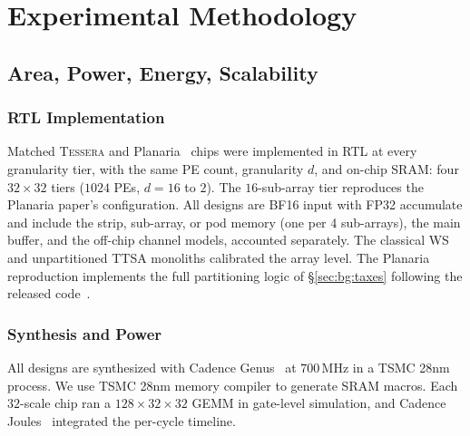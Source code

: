 \section{Experimental Methodology}
\label{sec:method}

\subsection{Area, Power, Energy, Scalability}
\label{sec:method:ppa}
\subsubsection{RTL Implementation}
Matched \textsc{Tessera} and Planaria~\cite{ghodrati2020planaria} chips were implemented
in RTL at every granularity tier, with the same PE count, granularity
$d$, and on-chip SRAM: four $32{\times}32$ tiers ($1024$ PEs,
$d{=}16$ to $2$). The $16$-sub-array tier reproduces the Planaria
paper's configuration. All designs are
BF16 input with FP32 accumulate and include the strip, sub-array, or
pod memory (one per 4 sub-arrays), the main buffer, and the off-chip
channel models, accounted separately. The classical WS and
unpartitioned TTSA
monoliths calibrated the array level. The Planaria reproduction
implements the full partitioning logic of \S\ref{sec:bg:taxes}
following the released code~\cite{ghodrati2020planaria}.

\subsubsection{Synthesis and Power}
All designs are synthesized with Cadence Genus~\cite{cadence_genus} at
$700$\,MHz in a TSMC 28nm process. We use TSMC 28nm memory compiler to generate SRAM macros.
Each $32$-scale chip ran a
$128{\times}32{\times}32$ GEMM in gate-level simulation, and
Cadence Joules~\cite{cadence_joules} integrated the per-cycle
timeline.





